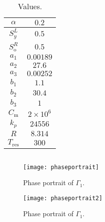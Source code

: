 \documentclass[
    8pt,
    aspectratio=1610,
    c,
    intlimits,
    leqno,
    professionalfonts,
]{beamer}
\begin{document}
\begin{frame}[fragile]
	\begin{columns}
		\begin{column}{0.51\textwidth}
			\begin{table}[ht!]
				\begin{tabular}{cc}
					\hline
					$\alpha$           & $0.2$            \\
					\hline
					$S^{L}_{y}$        & $0.5$            \\
					\hline
					$S^{R}_{\text{o}}$ & $0.5$            \\
					\hline
					$a_{1}$            & $0.00189$        \\
					\hline
					$a_{2}$            & $27.6$           \\
					\hline
					$a_{3}$            & $0.00252$        \\
					\hline
					$b_{1}$            & $1.1$            \\
					\hline
					$b_{2}$            & $30.4$           \\
					\hline
					$b_{3}$            & $1$              \\
					\hline
					$C_{\text{m}}$     & $2\times 10^{6}$ \\
					\hline
					$k_{p}$            & $24556$          \\
					\hline
					$R$                & $8.314$          \\
					\hline
					$T_{\text{res}}$   & $300$            \\
					\hline
				\end{tabular}
				\caption{Values.}
			\end{table}
		\end{column}
		\begin{column}{0.45\textwidth}
			\inputminted[fontsize=\tiny]{text}{calculations.txt}
		\end{column}
	\end{columns}
\end{frame}

\begin{frame}
	\begin{figure}[ht!]
		\centering
		\texttt{[image: phaseportrait]}
		\caption{Phase portrait of $\Gamma_{1}$.}
	\end{figure}
\end{frame}

\begin{frame}
	\begin{figure}[ht!]
		\centering
		\texttt{[image: phaseportrait2]}
		\caption{Phase portrait of $\Gamma_{1}$.}
	\end{figure}
\end{frame}
\end{document}
